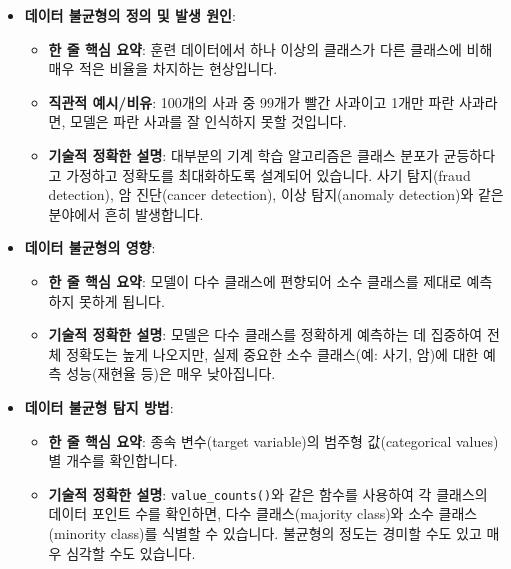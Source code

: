 \documentclass[11pt,a4paper]{article}
\theoremstyle{definition}
\begin{document}
\begin{itemize}
\begin{itemize}
\begin{itemize}
    \item \textbf{데이터 불균형의 정의 및 발생 원인}:
    \begin{itemize}
        \item \textbf{한 줄 핵심 요약}: 훈련 데이터에서 하나 이상의 클래스가 다른 클래스에 비해 매우 적은 비율을 차지하는 현상입니다.
        \item \textbf{직관적 예시/비유}: 100개의 사과 중 99개가 빨간 사과이고 1개만 파란 사과라면, 모델은 파란 사과를 잘 인식하지 못할 것입니다.
        \item \textbf{기술적 정확한 설명}: 대부분의 기계 학습 알고리즘은 클래스 분포가 균등하다고 가정하고 정확도를 최대화하도록 설계되어 있습니다. 사기 탐지(fraud detection), 암 진단(cancer detection), 이상 탐지(anomaly detection)와 같은 분야에서 흔히 발생합니다.
    \end{itemize}

    \item \textbf{데이터 불균형의 영향}:
    \begin{itemize}
        \item \textbf{한 줄 핵심 요약}: 모델이 다수 클래스에 편향되어 소수 클래스를 제대로 예측하지 못하게 됩니다.
        \item \textbf{기술적 정확한 설명}: 모델은 다수 클래스를 정확하게 예측하는 데 집중하여 전체 정확도는 높게 나오지만, 실제 중요한 소수 클래스(예: 사기, 암)에 대한 예측 성능(재현율 등)은 매우 낮아집니다.
    \end{itemize}

    \item \textbf{데이터 불균형 탐지 방법}:
    \begin{itemize}
        \item \textbf{한 줄 핵심 요약}: 종속 변수(target variable)의 범주형 값(categorical values)별 개수를 확인합니다.
        \item \textbf{기술적 정확한 설명}: \texttt{value_counts()}와 같은 함수를 사용하여 각 클래스의 데이터 포인트 수를 확인하면, 다수 클래스(majority class)와 소수 클래스(minority class)를 식별할 수 있습니다. 불균형의 정도는 경미할 수도 있고 매우 심각할 수도 있습니다.
    \end{itemize}


\end{itemize}
\end{itemize}
\end{itemize}
\end{document}
